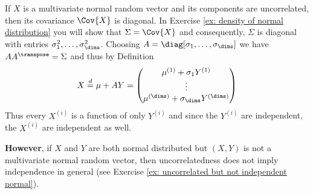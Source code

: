 \begin{remark}
    If \(X\) is a multivariate normal random vector and its components are
    uncorrelated, then its covariance \(\Cov{X}\) is diagonal.
    In Exercise \ref{ex: density of normal distribution} you will show
    that \(\Sigma = \Cov{X}\) and consequently, \(\Sigma\) is diagonal
    with entries \(\sigma_1^2, \ldots, \sigma_\dims^2\).
    Choosing \(A = \diag[\sigma_1, \ldots, \sigma_\dims]\)
    we have \(AA^\transpose = \Sigma\) and thus by Definition
    \[
        X \overset{d}= \mu + A Y = \begin{pmatrix}
            \mu^{(1)} + \sigma_1 Y^{(1)} \\
            \vdots \\
            \mu^{(\dims)} + \sigma_\dims Y^{(\dims)}
        \end{pmatrix}
    \]
    Thus every \(X^{(i)}\) is a function of only \(Y^{(i)}\) and since the
    \(Y^{(i)}\) are independent, the \(X^{(i)}\) are independent as well.

    \textbf{However}, if \(X\) and \(Y\) are both normal distributed but
    \((X,Y)\) is not a multivariate normal random vector, then uncorrelatedness
    does not imply independence in general (see Exercise \ref{ex: uncorrelated
    but not independent normal}).
\end{remark}

